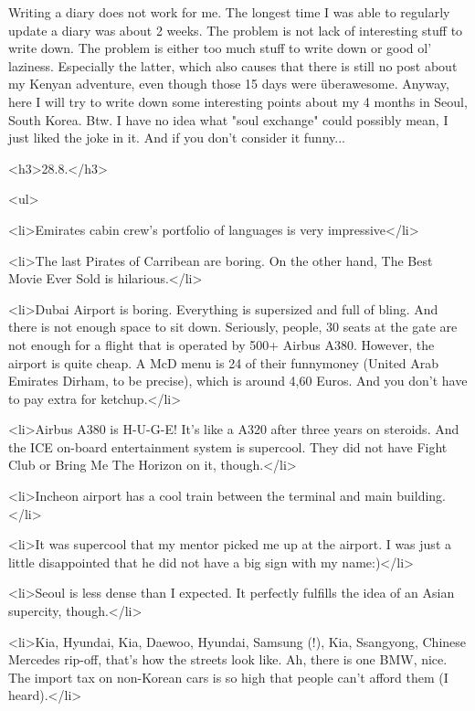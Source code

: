 \begin{post}
	\begin{content}
Writing a diary does not work for me. The longest time I was able to regularly update a diary was about 2 weeks. The problem is not lack of interesting stuff to write down. The problem is either too much stuff to write down or good ol' laziness. Especially the latter, which also causes that there is still no post about my Kenyan adventure, even though those 15 days were überawesome. Anyway, here I will try to write down some interesting points about my 4 months in Seoul, South Korea. Btw. I have no idea what "soul exchange" could possibly mean, I just liked the joke in it. And if you don't consider it funny...

<h3>28.8.</h3>

<ul>

	<li>Emirates cabin crew's portfolio of languages is very impressive</li>

	<li>The last Pirates of Carribean are boring. On the other hand, The Best Movie Ever Sold is hilarious.</li>

	<li>Dubai Airport is boring. Everything is supersized and full of bling. And there is not enough space to sit down. Seriously, people, 30 seats at the gate are not enough for a flight that is operated by 500+ Airbus A380. However, the airport is quite cheap. A McD menu is 24 of their funnymoney (United Arab Emirates Dirham, to be precise), which is around 4,60 Euros. And you don't have to pay extra for ketchup.</li>

	<li>Airbus A380 is H-U-G-E! It's like a A320 after three years on steroids. And the ICE on-board entertainment system is supercool. They did not have Fight Club or Bring Me The Horizon on it, though.</li>

	<li>Incheon airport has a cool train between the terminal and main building.</li>

	<li>It was supercool that my mentor picked me up at the airport. I was just a little disappointed that he did not have a big sign with my name:)</li>

	<li>Seoul is less dense than I expected. It perfectly fulfills the idea of an Asian supercity, though.</li>

	<li>Kia, Hyundai, Kia, Daewoo, Hyundai, Samsung (!), Kia, Ssangyong, Chinese Mercedes rip-off, that's how the streets look like. Ah, there is one BMW, nice. The import tax on non-Korean cars is so high that people can't afford them (I heard).</li>


\end{content}
\end{post}
